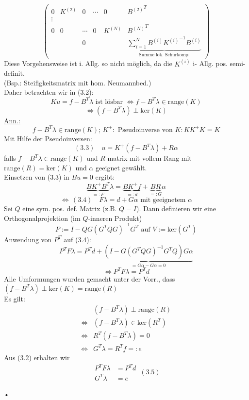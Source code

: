 \begin{enumerate}
\[\begin{pmatrix}
				0 & K^{(2)}   & 0 & \cdots  &0 & {B^{(2)}}^T\\
				\vdots\\
				 0 & 0 & \cdots & 0 & K^{(N)} & {B^{(N)}}^T \\
			           &     &      0    &   &            &  \underbrace{\sum_{i=1}^N B^{(i)}{K^{(i)}}^{-1} B^{(i)}}_{\text{Summe lok. Schurkomp.}}
				\end{pmatrix}
\]
Diese Vorgehensweise ist i. Allg. so nicht möglich, da die $K^{(i)}$ i- Allg. pos. semi-definit.\\
(Bsp.: Steifigkeitsmatrix mit hom. Neumannbed.)\\
Daher betrachten wir in (3.2):
\[ Ku=f-B^T\lambda \text{ ist lösbar } \Leftrightarrow f-B^T\lambda \in \text{range}(K) \]
\[ \Leftrightarrow (f-B^T\lambda) \perp \text{ker}(K) \]
\underline{Ann.:}
\[ f-B^T\lambda \in \text{range}(K);\, K^+ : \text{ Pseudoinverse von } K: KK^+K=K \]
Mit Hilfe der Pseudoinversen:
\[(3.3)\quad  u=K^+(f-B^T\lambda)+R\alpha  \]
falls $f-B^T\lambda \in \text{range}(K)$ und $R$ matrix mit vollem Rang mit $\text{range}(R)= \text{ker}(K)$ und $\alpha$ geeignet gewählt.\\
Einsetzen von (3.3) in $Bu=0$ ergibt:
\[ \underbrace{BK^+ B^T}_{=:F} \lambda = \underbrace{BK^+ f}_{=:d} + \underbrace{BR}_{=:G}\alpha \]
\[ \Leftrightarrow \, (3.4) \quad \boxed{ F\lambda= d + G\alpha } \text{ mit geeignetem } \alpha \]
Sei $Q$ eine sym. pos. def. Matrix (z.B. $Q=I$). Dann definieren wir eine Orthogonalprojektion (im $Q$-inneren Produkt)
\[ P:=I-QG(G^TQG)^{-1}G^T \text{ auf } V:= \text{ker}(G^T) \]
Anwendung von $P^T$  auf (3.4):
\[ P^TF\lambda = P^Td + \underbrace{(I-G(G^TQG)^{-1}G^TQ)G\alpha}_{=G\alpha - G\alpha=0} \]
\[ \Leftrightarrow \boxed{P^TF\lambda = P^T d } \]
Alle Umformungen wurden gemacht unter der Vorr., dass $ (f-B^T\lambda)\perp \text{ker}(K)=\text{range}(R)$ \\
Es gilt:
\begin{align*}
 & (f-B^T\lambda)\perp \text{range}(R) \\
\Leftrightarrow & (f-B^T\lambda) \in \text{ker} (R^T) \\
\Leftrightarrow & R^T(f-B^T\lambda)=0 \\
\Leftrightarrow & G^T\lambda = R^Tf =:e
\end{align*}
Aus (3.2) erhalten wir
\[ \boxed{ \begin{aligned} P^TF\lambda &= P^Td \\ G^T\lambda &= e  \end{aligned}} \, (3.5) \]







\end{enumerate}• 